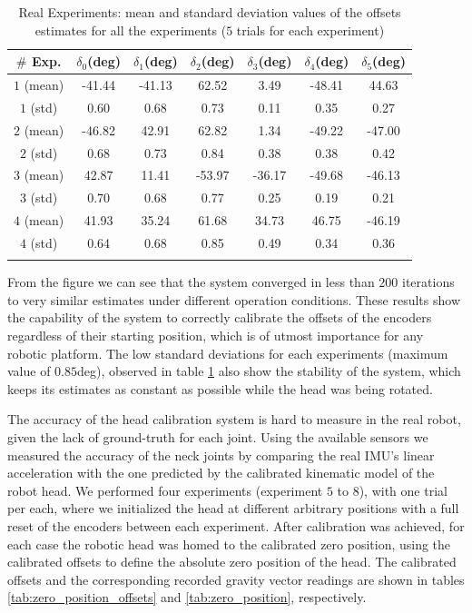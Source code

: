 \begin{table}
\centering
\begin{tabular}{ccccccc}
 \hline
 $\#$ Exp. & $\delta_0$(deg) & $\delta_1$(deg) & $\delta_2$(deg) & $\delta_3$(deg) & $\delta_4$(deg) & $\delta_5$(deg) \\
 \hline
$1$ (mean) & -41.44 & -41.13 & 62.52 & 3.49 & -48.41 & 44.63 \\
$1$ (std) & 0.60 & 0.68 & 0.73 & 0.11 & 0.35 & 0.27 \\
\hline
$2$ (mean) & -46.82 & 42.91 & 62.82 & 1.34 & -49.22 & -47.00 \\
$2$ (std) & 0.68 & 0.73 & 0.84 & 0.38 & 0.38 & 0.42 \\
\hline
$3$ (mean) & 42.87 & 11.41 & -53.97 & -36.17 & -49.68 & -46.13 \\
$3$ (std) & 0.70 & 0.68 & 0.77 & 0.25 & 0.19 & 0.21 \\
\hline
$4$ (mean) & 41.93 & 35.24 & 61.68 & 34.73 & 46.75 & -46.19 \\
$4$ (std) & 0.64 & 0.68 & 0.85 & 0.49 & 0.34 & 0.36 \\
 \hline\\
\end{tabular}
\caption{Real Experiments: mean and standard deviation values of the offsets estimates for all the experiments ($5$ trials for each experiment)}
\label{tab:real_head_offsets_convergence}
\end{table}

From the figure we can see that the system converged in less than $200$ iterations to very similar estimates under different operation conditions. These results show the capability of the system to correctly calibrate the offsets of the encoders regardless of their starting position, which is of utmost importance for any robotic platform. The low standard deviations for each experiments (maximum value of $0.85$deg), observed in table \ref{tab:real_head_offsets_convergence} also show the stability of the system, which keeps its estimates as constant as possible while the head was being rotated.  

The accuracy of the head calibration system is hard to measure in the real robot, given the lack of ground-truth for each joint. Using the available sensors we measured the accuracy of the neck joints by comparing the real IMU's linear acceleration with the one predicted by the calibrated kinematic model of the robot head. We performed four experiments (experiment $5$ to $8$), with one trial per each, where we initialized the head at different arbitrary positions with a full reset of the encoders between each experiment. After calibration was achieved, for each case the robotic head was homed to the calibrated zero position, using the calibrated offsets to define the absolute zero position of the head. The calibrated offsets and the corresponding recorded gravity vector readings are shown in tables \ref{tab:zero_position_offsets} and \ref{tab:zero_position}, respectively.


